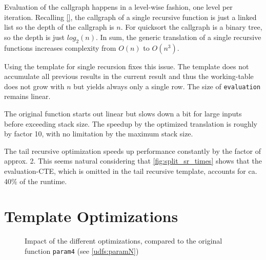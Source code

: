 Evaluation of the callgraph happens in a level-wise fashion, one level per iteration. Recalling \autoref{}, the callgraph of a single recursive function is just a linked list so the depth of the callgraph is $n$. For quicksort the callgraph is a binary tree, so the depth is just $log_2(n)$. In sum, the generic translation of a single recursive functions increases complexity from $O(n)$ to $O(n^3)$.

Using the template for single recursion fixes this issue. The template does not accumulate all previous results in the current result and thus the working-table does not grow with $n$ but yields always only a single row. The size of \texttt{evaluation} remains linear.

The original function starts out linear but slows down a bit for large inputs before exceeding stack size. The speedup by the optimized translation is roughly by factor 10, with no limitation by the maximum stack size.

The tail recursive optimization speeds up performance constantly by the factor of approx. 2. This seems natural considering that \autoref{fig:split_sr_times} shows that the evaluation-CTE, which is omitted in the tail recursive template, accounts for ca. 40\% of the runtime.

\section{Template Optimizations}


\begin{figure}[h!]
    \centering\small
    
    \caption{Impact of the different optimizations, compared to the original function \texttt{param4} (see \autoref{udfs:paramN})}
    \label{fig:paramN}
\end{figure}



